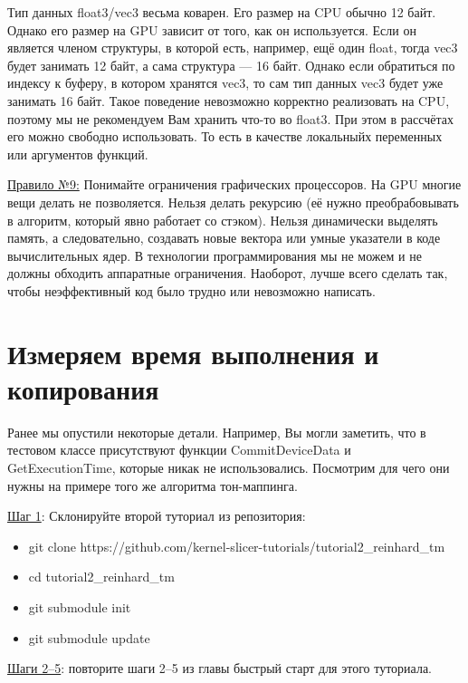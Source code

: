 \documentclass[11pt,fleqn,english,russian]{report} %
\begin{document}
\begin{remark}
Тип данных float3/vec3 весьма коварен. Его размер на CPU обычно 12 байт. Однако его размер на GPU зависит от того, как он используется. Если он является членом структуры, в которой есть, например, ещё один float, тогда vec3 будет занимать 12 байт, а сама структура --- 16 байт. Однако если обратиться по индексу к буферу, в котором хранятся vec3, то сам тип данных vec3 будет уже занимать 16 байт. Такое поведение невозможно корректно реализовать на CPU, поэтому мы не рекомендуем Вам хранить что-то во float3. При этом в рассчётах его можно свободно использовать. То есть в качестве локальныйх переменных или аргументов функций.
\end{remark}	

\underline{Правило №9:} Понимайте ограничения графических процессоров. На GPU многие вещи делать не позволяется. Нельзя делать рекурсию (её нужно преобрабовывать в алгоритм, который явно работает со стэком). Нельзя динамически выделять память, а следовательно, создавать новые вектора или умные указатели в коде вычислительных ядер. В технологии программирования мы не можем и не должны обходить аппаратные ограничения. Наоборот, лучше всего сделать так, чтобы неэффективный код было трудно или невозможно написать.

\section{Измеряем время выполнения и копирования}

Ранее мы опустили некоторые детали. Например, Вы могли заметить, что в тестовом классе присутствуют функции CommitDeviceData и GetExecutionTime, которые никак не использовались. Посмотрим для чего они нужны на примере того же алгоритма тон-маппинга.

\noindent\underline{Шаг 1}: Склонируйте второй туториал из репозитория:

\begin{itemize}
	\item git clone https://github.com/kernel-slicer-tutorials/tutorial2\_reinhard\_tm
	\item cd tutorial2\_reinhard\_tm
	\item git submodule init
	\item git submodule update
\end{itemize}

\vspace*{5px}
\noindent\underline{Шаги 2--5}: повторите шаги 2--5 из главы быстрый старт для этого туториала. 
\end{document}
